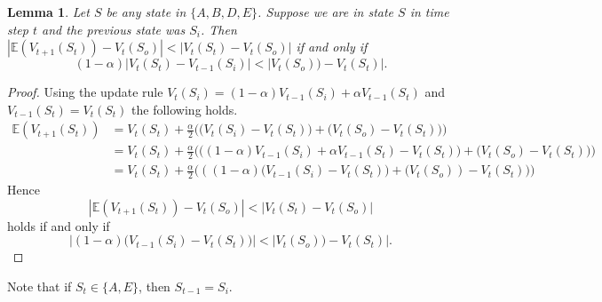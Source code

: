 \documentclass[12pt,a4paper]{article}
\newtheorem{lemma}{Lemma}
\begin{document}
\begin{enumerate}
\begin{lemma}
  Let $S$ be any state in $\{A, B, D, E\}$. Suppose we are in state $S$ in
  time step $t$ and the previous state was $S_i$. Then
  $|\mathbb{E}(V_{t + 1}(S_t)) - V_{t}(S_o)| < |V_t(S_t) - V_{t}(S_o)|$ if and only if
  \[
  (1 - \alpha) |V_t(S_t) - V_{t - 1} (S_i)| < |V_t(S_o)) - V_t(S_t)|.
  \]
\end{lemma}
\begin{proof}
  Using the update rule $ V_t(S_i) = (1 - \alpha) V_{t - 1}(S_i) + \alpha V_{t - 1}(S_t)$
  and $V_{t - 1}(S_t) = V_t(S_t)$ the following holds.
  \begin{align*}
  \mathbb{E}(V_{t + 1}(S_t))
  & = V_t(S_t) + \frac{\alpha}{2} \Big(\big(V_t(S_i) - V_t(S_t)\big) + \big(V_t(S_o) - V_t(S_t)\big)\Big)\\
  & = V_t(S_t) + \frac{\alpha}{2} \Big(\big((1 - \alpha) V_{t - 1}(S_i) +
  \alpha V_{t - 1}(S_t) - V_t(S_t)\big) + \big(V_t(S_o) - V_t(S_t)\big)\Big)\\
  & = V_t(S_t) + \frac{\alpha}{2} \Big(((1 - \alpha) \big(V_{t - 1}(S_i) - V_t(S_t)\big)
  + \big(V_t(S_o)) - V_t(S_t)\big)\Big)
  \end{align*}
  Hence
  \[|\mathbb{E}(V_{t + 1}(S_t)) - V_{t}(S_o)| < |V_t(S_t) - V_{t}(S_o)|\]
  holds if and only if
  \[|(1 - \alpha) \big(V_{t - 1}(S_i) - V_{t}(S_t)\big)| < |V_t(S_o)) - V_t(S_t)|.\]
\end{proof}

Note that if $S_t \in \{A, E\}$, then $S_{t - 1} = S_i$.


\end{enumerate}
\end{document}
